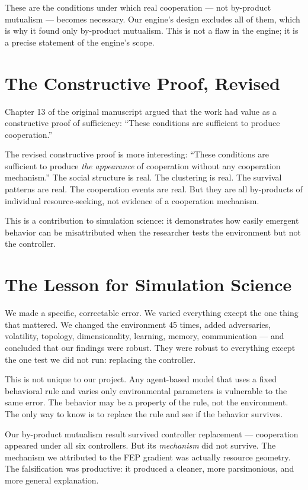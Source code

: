 These are the conditions under which real cooperation --- not by-product mutualism --- becomes necessary. Our engine's design excludes all of them, which is why it found only by-product mutualism. This is not a flaw in the engine; it is a precise statement of the engine's scope.

\section{The Constructive Proof, Revised}\label{the-constructive-proof-revised}

Chapter 13 of the original manuscript argued that the work had value as a constructive proof of sufficiency: ``These conditions are sufficient to produce cooperation.''

The revised constructive proof is more interesting: ``These conditions are sufficient to produce \emph{the appearance} of cooperation without any cooperation mechanism.'' The social structure is real. The clustering is real. The survival patterns are real. The cooperation events are real. But they are all by-products of individual resource-seeking, not evidence of a cooperation mechanism.

This is a contribution to simulation science: it demonstrates how easily emergent behavior can be misattributed when the researcher tests the environment but not the controller.

\section{The Lesson for Simulation Science}\label{the-lesson-for-simulation-science}

We made a specific, correctable error. We varied everything except the one thing that mattered. We changed the environment 45 times, added adversaries, volatility, topology, dimensionality, learning, memory, communication --- and concluded that our findings were robust. They were robust to everything except the one test we did not run: replacing the controller.

This is not unique to our project. Any agent-based model that uses a fixed behavioral rule and varies only environmental parameters is vulnerable to the same error. The behavior may be a property of the rule, not the environment. The only way to know is to replace the rule and see if the behavior survives.

Our by-product mutualism result survived controller replacement --- cooperation appeared under all six controllers. But its \emph{mechanism} did not survive. The mechanism we attributed to the FEP gradient was actually resource geometry. The falsification was productive: it produced a cleaner, more parsimonious, and more general explanation.


